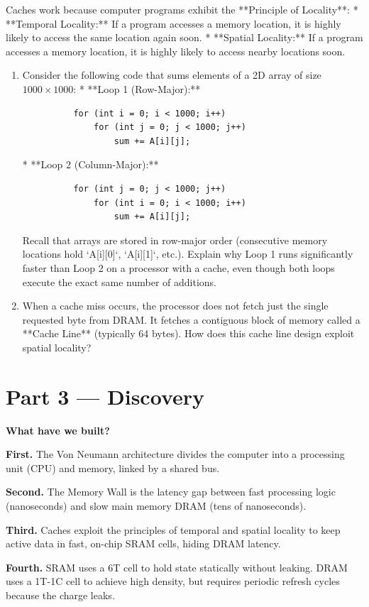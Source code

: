 \documentclass[12pt, a4paper]{book}
\begin{document}
\begin{explobox}
Caches work because computer programs exhibit the **Principle of Locality**:
* **Temporal Locality:** If a program accesses a memory location, it is highly likely to access the same location again soon.
* **Spatial Locality:** If a program accesses a memory location, it is highly likely to access nearby locations soon.
\begin{enumerate}[label=(\alph*), leftmargin=*]
  \item Consider the following code that sums elements of a 2D array of size $1000 \times 1000$:
        * **Loop 1 (Row-Major):**
          \begin{verbatim}
          for (int i = 0; i < 1000; i++)
              for (int j = 0; j < 1000; j++)
                  sum += A[i][j];
          \end{verbatim}
        * **Loop 2 (Column-Major):**
          \begin{verbatim}
          for (int j = 0; j < 1000; j++)
              for (int i = 0; i < 1000; i++)
                  sum += A[i][j];
          \end{verbatim}
        Recall that arrays are stored in row-major order (consecutive memory locations hold `A[i][0]`, `A[i][1]`, etc.).
        Explain why Loop 1 runs significantly faster than Loop 2 on a processor with a cache, even though both loops execute the exact same number of additions.
  \item When a cache miss occurs, the processor does not fetch just the single requested byte from DRAM. It fetches a contiguous block of memory called a **Cache Line** (typically 64 bytes).
        How does this cache line design exploit spatial locality?
\end{enumerate}
\end{explobox}

\newpage

\section{Part 3 --- Discovery}

\begin{discoverybox}
\textbf{What have we built?}

\textbf{First.} The Von Neumann architecture divides the computer into a processing unit (CPU) and memory, linked by a shared bus.

\textbf{Second.} The Memory Wall is the latency gap between fast processing logic (nanoseconds) and slow main memory DRAM (tens of nanoseconds).

\textbf{Third.} Caches exploit the principles of temporal and spatial locality to keep active data in fast, on-chip SRAM cells, hiding DRAM latency.

\textbf{Fourth.} SRAM uses a 6T cell to hold state statically without leaking. DRAM uses a 1T-1C cell to achieve high density, but requires periodic refresh cycles because the charge leaks.
\end{discoverybox}
\end{document}
